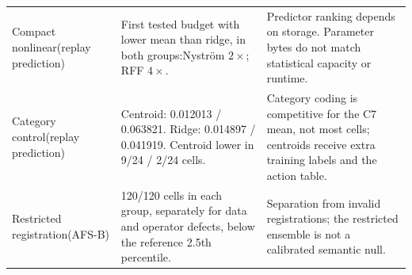 \begin{table}[t]
\begin{tabular}{@{}p{}p{}p{}@{}}
\addlinespace[3pt]
Compact nonlinear\newline (replay prediction) & First tested budget with lower mean than ridge, in both groups:\newline Nystr\"om $2\times$; RFF $4\times$. & Predictor ranking depends on storage. Parameter bytes do not match statistical capacity or runtime. \\
\addlinespace[3pt]
Category control\newline (replay prediction) & Centroid: 0.012013 / 0.063821. \newline Ridge: 0.014897 / 0.041919. \newline Centroid lower in 9/24 / 2/24 cells. & Category coding is competitive for the C7 mean, not most cells; centroids receive extra training labels and the action table. \\
\addlinespace[3pt]
Restricted registration\newline (AFS-B) & 120/120 cells in each group, separately for data and operator defects, below the reference 2.5th percentile. & Separation from invalid registrations; the restricted ensemble is not a calibrated semantic null. \\
\bottomrule
\end{tabular}
\end{table}
